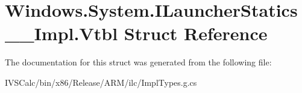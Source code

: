 \hypertarget{struct_windows_1_1_system_1_1_i_launcher_statics_____impl_1_1_vtbl}{}\section{Windows.\+System.\+I\+Launcher\+Statics\+\_\+\+\_\+\+Impl.\+Vtbl Struct Reference}
\label{struct_windows_1_1_system_1_1_i_launcher_statics_____impl_1_1_vtbl}


The documentation for this struct was generated from the following file\+:\begin{DoxyCompactItemize}
\item 
I\+V\+S\+Calc/bin/x86/\+Release/\+A\+R\+M/ilc/Impl\+Types.\+g.\+cs\end{DoxyCompactItemize}
